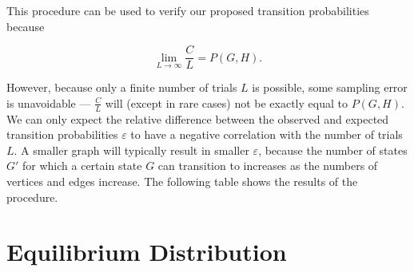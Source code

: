 \documentclass[a4paper,10pt]{article}
\begin{document}
This procedure can be used to verify our proposed transition probabilities because

\begin{equation}
 \lim_{L \to \infty} \frac{C}{L} = P(G, H).
\end{equation}

However, because only a finite number of trials $L$ is possible, some sampling error is unavoidable --- $\frac{C}{L}$ will (except in rare cases) not be exactly equal to $P(G, H)$. We can only expect the relative difference between the observed and expected transition probabilities $\varepsilon$ to have a negative correlation with the number of trials $L$. A smaller graph will typically result in smaller $\varepsilon$, because the number of states $G'$ for which a certain state $G$ can transition to increases as the numbers of vertices and edges increase. The following table shows the results of the procedure. 

\begin{table}[ht]
\centering
{}
\qquad
{}
\caption{The results of several executions of the procedure on states with 4 vertices and 2 edges. An arbitrarily chosen $I$-value of $0.5$ was used. The same states $G$ and $H$ were used for each execution. The very low $\varepsilon$ values for $L = 10^5$ and the negative correlation between $\varepsilon$ and $L$ provide evidence that the expressions we derived for $P(G, H)$ are valid.}
\end{table}


\section{Equilibrium Distribution}
\end{document}
